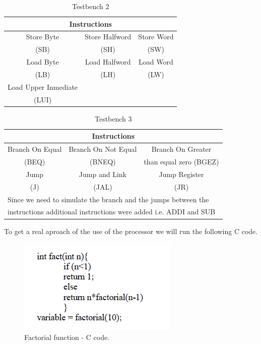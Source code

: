 \documentclass[conference]{IEEEtran}
\begin{document}
\begin{table}[t]
\caption{Testbench 2} %
\begin{center}
\begin{tabular}{|c|c|c|}
\hline
\multicolumn{3}{|c|}{\textbf{Instructions}} \\
\hline
Store Byte&Store Halfword&Store Word\\
(SB)&(SH)&(SW)  \\
\hline
Load Byte&Load Halfword&Load Word\\
(LB)&(LH)&(LW) \\
\hline
Load Upper Inmediate&&\\
(LUI)&& \\
\hline
\end{tabular}
\label{tab_test2}
\end{center}
\end{table}

\begin{table}[htbp]
\caption{Testbench 3} %
\begin{center}
\begin{tabular}{|c|c|c|}
\hline
\multicolumn{3}{|c|}{\textbf{Instructions}} \\
\hline
Branch On Equal&Branch On Not Equal&Branch On Greater \\
(BEQ)&(BNEQ)&than equal zero (BGEZ)  \\
\hline
Jump&Jump and Link&Jump Register\\
(J)&(JAL)&(JR) \\
\hline
\multicolumn{3}{l}{Since we need to simulate the branch and the jumps between the} \\
\multicolumn{3}{l}{instructions additional instructions were added i.e. ADDI and  SUB}\\
\end{tabular}
\label{tab_test3}
\end{center}
\end{table}

To get a real aproach of the use of the processor we will run the following C code.
\begin{figure}[h]
\begin{center}
\includegraphics[scale=0.8]{factorial_c.png}
\caption{Factorial function - C code.}
\label{fact_c}
\end{center}
\end{figure}
\end{document}
